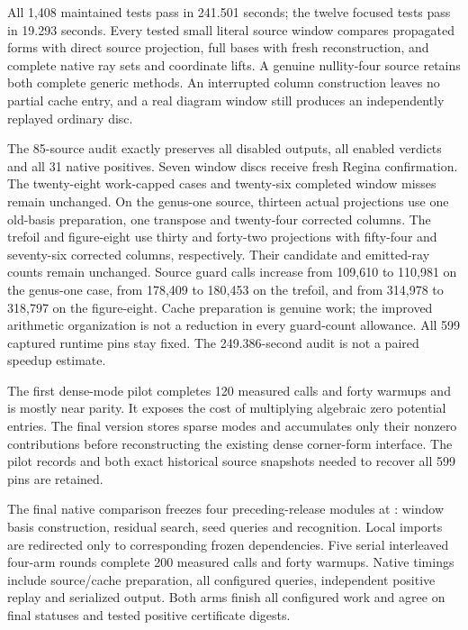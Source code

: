 All 1,408 maintained tests pass in 241.501 seconds; the twelve focused
tests pass in 19.293 seconds. Every tested small literal source window
compares propagated forms with direct source projection, full bases with
fresh reconstruction, and complete native ray sets and coordinate lifts.
A genuine nullity-four source retains both complete generic methods.
An interrupted column construction leaves no partial cache entry, and a
real diagram window still produces an independently replayed ordinary disc.

The 85-source audit exactly preserves all disabled outputs, all enabled
verdicts and all 31 native positives. Seven window discs receive fresh
Regina confirmation. The twenty-eight work-capped cases and twenty-six
completed window misses remain unchanged. On the genus-one source, thirteen
actual projections use one old-basis preparation, one transpose and twenty-four
corrected columns. The trefoil and figure-eight use thirty and forty-two
projections with fifty-four and seventy-six corrected columns, respectively.
Their candidate and emitted-ray counts remain unchanged. Source guard calls
increase from 109,610 to 110,981 on the genus-one case, from 178,409 to 180,453
on the trefoil, and from 314,978 to 318,797 on the figure-eight. Cache preparation
is genuine work; the improved arithmetic organization is not a reduction
in every guard-count allowance. All 599 captured runtime pins stay fixed.
The 249.386-second audit is not a paired speedup estimate.

The first dense-mode pilot completes 120 measured calls and forty warmups
and is mostly near parity. It exposes the cost of multiplying algebraic zero
potential entries. The final version stores sparse modes and accumulates
only their nonzero contributions before reconstructing the existing dense
corner-form interface. The pilot records and both exact historical source
snapshots needed to recover all 599 pins are retained.

The final native comparison freezes four preceding-release modules at
: window basis construction, residual search, seed queries
and recognition. Local imports are redirected only to corresponding frozen
dependencies. Five serial interleaved four-arm rounds complete 200 measured
calls and forty warmups. Native timings include source/cache preparation,
all configured queries, independent positive replay and serialized output.
Both arms finish all configured work and agree on final statuses and tested
positive certificate digests.

